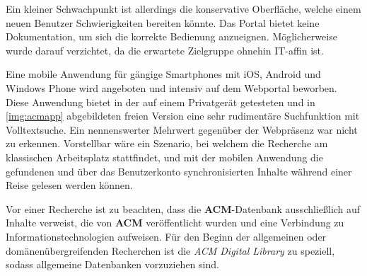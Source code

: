 \documentclass[
	ngerman,
	parskip=half,
	headsepline,
	fontsize=12pt,
	DIV=13,
	listof=leveldown,
	]{scrreprt}
\begin{document}
	Ein kleiner Schwachpunkt ist allerdings die konservative Oberfläche, welche einem neuen Benutzer Schwierigkeiten bereiten könnte. Das Portal bietet keine Dokumentation, um sich die korrekte Bedienung anzueignen. Möglicherweise wurde darauf verzichtet, da die erwartete Zielgruppe ohnehin IT-affin ist.	

	Eine mobile Anwendung für gängige Smartphones mit iOS, Android und Windows Phone wird angeboten und intensiv auf dem Webportal beworben. Diese Anwendung bietet in der auf einem Privatgerät getesteten und in \cref{img:acmapp} abgebildeten freien Version eine sehr rudimentäre Suchfunktion mit Volltextsuche. Ein nennenswerter Mehrwert gegenüber der Webpräsenz war nicht zu erkennen. Vorstellbar wäre ein Szenario, bei welchem die Recherche am klassischen Arbeitsplatz stattfindet, und mit der mobilen Anwendung die gefundenen und über das Benutzerkonto synchronisierten Inhalte während einer Reise gelesen werden können.
		
	Vor einer Recherche ist zu beachten, dass die \textbf{ACM}-Datenbank ausschließlich auf Inhalte verweist, die von \textbf{ACM} veröffentlicht wurden und  eine Verbindung zu Informationstechnologien aufweisen. Für den Beginn der allgemeinen oder domänenübergreifenden Recherchen ist die \textsl{ACM Digital Library} zu speziell, sodass allgemeine Datenbanken vorzuziehen sind.	
	
	
	\printbibliography[title=Literaturverzeichnis,nottype=misc]
	\nopagebreak
	\printbibliography[title=Bildquellen,type=misc]
	
\end{document}
